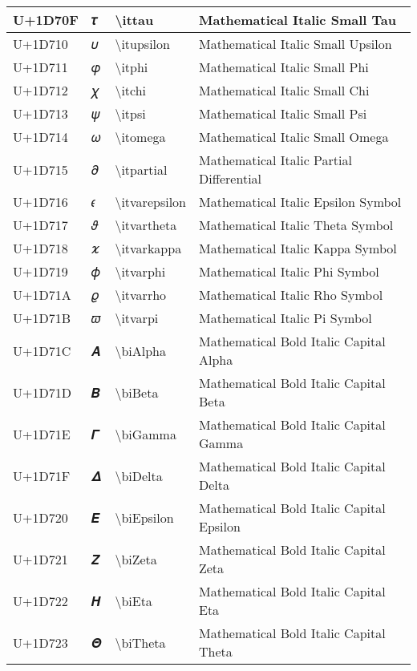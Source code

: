 \begin{table}[h]
\begin{tabulary}{\linewidth}{|L|L|L|L|}
\hline
U+1D70F & 𝜏 & {\textbackslash}ittau & Mathematical Italic Small Tau \\
\hline
U+1D710 & 𝜐 & {\textbackslash}itupsilon & Mathematical Italic Small Upsilon \\
\hline
U+1D711 & 𝜑 & {\textbackslash}itphi & Mathematical Italic Small Phi \\
\hline
U+1D712 & 𝜒 & {\textbackslash}itchi & Mathematical Italic Small Chi \\
\hline
U+1D713 & 𝜓 & {\textbackslash}itpsi & Mathematical Italic Small Psi \\
\hline
U+1D714 & 𝜔 & {\textbackslash}itomega & Mathematical Italic Small Omega \\
\hline
U+1D715 & 𝜕 & {\textbackslash}itpartial & Mathematical Italic Partial Differential \\
\hline
U+1D716 & 𝜖 & {\textbackslash}itvarepsilon & Mathematical Italic Epsilon Symbol \\
\hline
U+1D717 & 𝜗 & {\textbackslash}itvartheta & Mathematical Italic Theta Symbol \\
\hline
U+1D718 & 𝜘 & {\textbackslash}itvarkappa & Mathematical Italic Kappa Symbol \\
\hline
U+1D719 & 𝜙 & {\textbackslash}itvarphi & Mathematical Italic Phi Symbol \\
\hline
U+1D71A & 𝜚 & {\textbackslash}itvarrho & Mathematical Italic Rho Symbol \\
\hline
U+1D71B & 𝜛 & {\textbackslash}itvarpi & Mathematical Italic Pi Symbol \\
\hline
U+1D71C & 𝜜 & {\textbackslash}biAlpha & Mathematical Bold Italic Capital Alpha \\
\hline
U+1D71D & 𝜝 & {\textbackslash}biBeta & Mathematical Bold Italic Capital Beta \\
\hline
U+1D71E & 𝜞 & {\textbackslash}biGamma & Mathematical Bold Italic Capital Gamma \\
\hline
U+1D71F & 𝜟 & {\textbackslash}biDelta & Mathematical Bold Italic Capital Delta \\
\hline
U+1D720 & 𝜠 & {\textbackslash}biEpsilon & Mathematical Bold Italic Capital Epsilon \\
\hline
U+1D721 & 𝜡 & {\textbackslash}biZeta & Mathematical Bold Italic Capital Zeta \\
\hline
U+1D722 & 𝜢 & {\textbackslash}biEta & Mathematical Bold Italic Capital Eta \\
\hline
U+1D723 & 𝜣 & {\textbackslash}biTheta & Mathematical Bold Italic Capital Theta \\

\end{tabulary}
\end{table}
